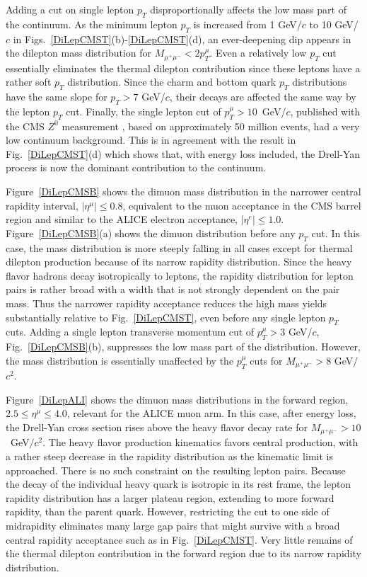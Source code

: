 Adding a cut on single lepton $p_T$ disproportionally affects the low mass 
part of the continuum.  As the minimum lepton $p_T$ is increased from 1 GeV/$c$ 
to 10 GeV/$c$ in Figs.~\ref{DiLepCMST}(b)-\ref{DiLepCMST}(d), an ever-deepening 
dip appears in the dilepton mass distribution for $M_{\mu^+ \mu^-} < 2 p_T^\mu$. 
Even a relatively low $p_T$ cut essentially eliminates the thermal dilepton
contribution since these leptons have a rather soft $p_T$ distribution.
Since the charm and bottom quark $p_T$ distributions have the same slope for
$p_T > 7$ GeV/$c$, 
their decays are affected the same way by the lepton $p_T$ cut.
Finally, the single lepton cut of $p_T^\mu > 
10$~GeV/$c$, published with the CMS $Z^0$ measurement \cite{zboson}, based on 
approximately 50 million events, had a very low continuum 
background. This is in agreement with the result in Fig.~\ref{DiLepCMST}(d) 
which
shows that, with energy loss included, the Drell-Yan process is now the
dominant contribution to the continuum.

Figure~\ref{DiLepCMSB} shows the dimuon mass distribution in the narrower
central rapidity interval, $|\eta^{\mu}|\leq 0.8 $, equivalent to the muon 
acceptance in
the CMS barrel region and similar to the ALICE electron acceptance, 
$|\eta^{e}|\leq 1.0$.  Figure~\ref{DiLepCMSB}(a) shows the dimuon distribution 
before any $p_T$ cut. In this case, the mass distribution is more steeply 
falling in all cases except for thermal dilepton production because of its 
narrow rapidity distribution.  Since the heavy flavor hadrons decay 
isotropically to leptons, the rapidity distribution for lepton pairs is rather 
broad with a width
that is not strongly dependent on the pair mass.  Thus the narrower rapidity
acceptance reduces the high mass yields substantially relative to 
Fig.~\ref{DiLepCMST}, even before any single lepton $p_T$ cuts.  Adding a single
lepton transverse momentum cut of $p_T^\mu > 3$ GeV/$c$, Fig.~\ref{DiLepCMSB}(b),
suppresses the low mass part of the distribution.  However, the mass 
distribution is essentially unaffected by the $p_T^\mu$ cuts for $M_{\mu^+ \mu^-} > 
8$ GeV/$c^2$.

Figure~\ref{DiLepALI} shows the dimuon mass distributions in the 
forward region, $2.5 \leq \eta^{\mu} \leq 4.0$, relevant for the ALICE muon 
arm.  In this case, after energy loss, the Drell-Yan cross section rises 
above the heavy flavor decay rate for $M_{\mu^+ \mu^-} > 10$~GeV$/c^2$.  
The heavy flavor production kinematics favors central production, with a 
rather steep decrease in the rapidity distribution as the kinematic limit is 
approached.  There is no such constraint on the resulting lepton pairs. 
 Because the decay of the individual heavy quark is isotropic in its rest 
frame, the lepton rapidity distribution has a larger plateau region, extending 
to more forward rapidity, than the parent quark. 
However, restricting the cut to one side of midrapidity eliminates many large gap pairs 
that might survive with a broad central rapidity acceptance such as in Fig.~\ref{DiLepCMST}.
Very little remains of the thermal dilepton contribution in the forward region
due to its narrow rapidity distribution.  
